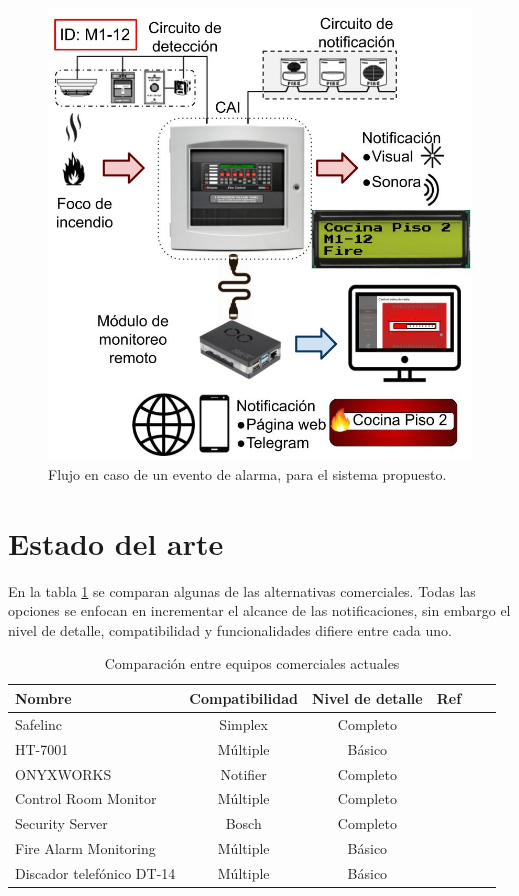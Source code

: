 \begin{figure}[ht]
	\centering
	\includegraphics[scale=.45]{./Figures/flujo_prop.jpg}
	\caption{Flujo en caso de un evento de alarma, para el sistema propuesto.}
	\label{fig:flujo_prop}
\end{figure}

\section{Estado del arte}
%

En la tabla \ref{tab:comp} se comparan algunas de las alternativas comerciales. Todas las opciones se enfocan en incrementar el alcance de las notificaciones, sin embargo el nivel de detalle, compatibilidad y funcionalidades difiere entre cada uno.


\begin{table}[h]
\centering
\caption[caption corto]{Comparación entre equipos comerciales actuales}
\begin{tabular}{l c c c c c}
\toprule
\textbf{Nombre} & \textbf{Compatibilidad}& \textbf{Nivel de detalle}& \textbf{Ref}\\
\midrule
Safelinc & Simplex & Completo & \citep{safelinc} \\
HT-7001 & Múltiple & Básico & \citep{ht7001}\\
ONYXWORKS & Notifier & Completo & \citep{onyxworks}\\
Control Room Monitor & Múltiple & Completo & \citep{nimbus} \\
Security Server & Bosch & Completo & \citep{ss_bosch} \\
Fire Alarm Monitoring & Múltiple & Básico & \citep{churches}\\
Discador telefónico DT-14 & Múltiple & Básico & \citep{dt_14}\\
\bottomrule
\hline
\end{tabular}
\label{tab:comp}
\end{table}

